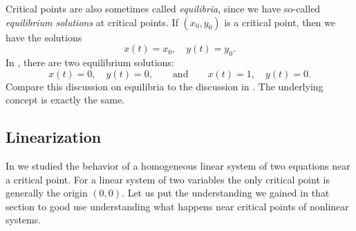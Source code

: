 \documentclass[12pt]{book}
\begin{document}
Critical points are also sometimes called
\emph{equilibria}, since we have so-called
\emph{equilibrium solutions} at critical points.
If $(x_0,y_0)$ is a critical point, then we have the solutions
\begin{equation*}
x(t) = x_0, \quad y(t) = y_0 .
\end{equation*}
In , there are two equilibrium
solutions:
\begin{equation*}
x(t) = 0, \quad y(t) = 0,
\qquad \text{and} \qquad
x(t) = 1, \quad y(t) = 0.
\end{equation*}
Compare this discussion on equilibria to the discussion in
.  The underlying concept is
exactly the same.

\subsection{Linearization}

In  we studied the behavior of a homogeneous
linear system of two equations near a critical point.  For a linear system
of two variables the only critical point is generally the origin $(0,0)$.
Let us put the understanding we gained in that section to good use
understanding what happens near critical points of nonlinear systems.
\end{document}
